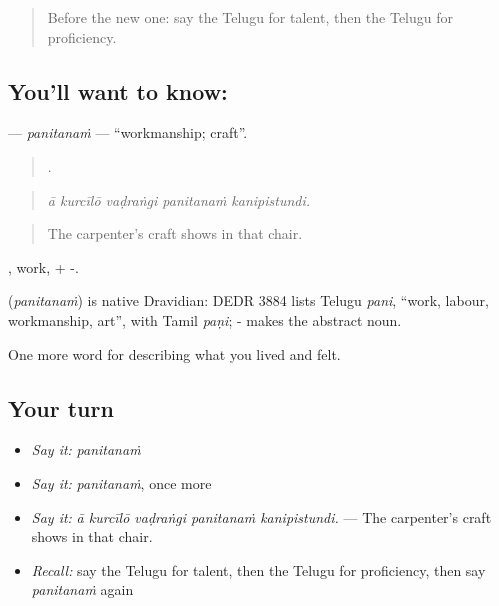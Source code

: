 \label{lesson:TE-C524-panitanam}



\begin{quote}
Before the new one: say the Telugu for talent, then the Telugu for proficiency.
\end{quote}

\subsection*{You'll want to know: }
\textbf{} — \emph{panitanaṁ} — \textquotedblleft{}workmanship; craft\textquotedblright{}.

\begin{quote}
    .
\end{quote}

\begin{quote}
\emph{ā kurcīlō vaḍraṅgi panitanaṁ kanipistundi.}
\end{quote}

\begin{quote}
The carpenter's craft shows in that chair.
\end{quote}

, work, + -.

\begin{cousinweb}
\textbf{} (\emph{panitanaṁ}) is native Dravidian: DEDR 3884 lists Telugu \emph{pani}, \textquotedblleft{}work, labour, workmanship, art\textquotedblright{}, with Tamil \emph{paṇi}; - makes the abstract noun.
\end{cousinweb}

\begin{grammarlens}[title={What you've built}]
One more word for describing what you lived and felt.
\end{grammarlens}

\subsection*{Your turn}
\begin{itemize}
\raggedright
  \item \emph{Say it:} \emph{panitanaṁ}
  \item \emph{Say it:} \emph{panitanaṁ}, once more
  \item \emph{Say it:} \emph{ā kurcīlō vaḍraṅgi panitanaṁ kanipistundi.} — The carpenter's craft shows in that chair.
  \item \emph{Recall:} say the Telugu for talent, then the Telugu for proficiency, then say \emph{panitanaṁ} again
\end{itemize}

